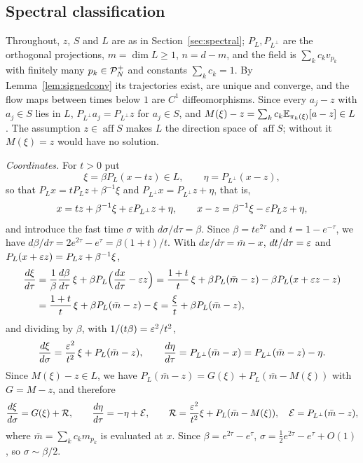 \documentclass{article} %
\makeatletter
\newif\ificlr
\newcommand{\placeblock}[1]{\ificlr\@nameuse{moved@#1}\fi}
\theoremstyle{plain}
\theoremstyle{definition}
\theoremstyle{remark}
\makeatother
\begin{document}
\subsection{Spectral classification}
\label{apx:pf-spectral}

\ificlr\placeblock{spectraldefs}

Throughout, $z$, $S$ and $L$ are as above\else Throughout, $z$, $S$ and $L$ are as in Section~\ref{sec:spectral}\fi; $P_L,P_{L^\perp}$ are the
orthogonal projections, $m=\dim L\ge1$, $n=d-m$, and the field is
$\sum_kc_kv_{p_k}$ with finitely many $p_k\in\mathcal{P}_N^{+}$ and constants $\sum_kc_k=1$. By
Lemma~\ref{lem:signedconv} its trajectories exist, are unique and converge, and the flow maps
between times below $1$ are $C^1$ diffeomorphisms. Since every $a_j-z$ with $a_j\in S$ lies in
$L$, $P_{L^\perp}a_j=P_{L^\perp}z$ for $a_j\in S$, and $M(\xi)-z=\sum_kc_k\mathbb{E}_{\pi_k(\xi)}[a-z]\in L$.
The assumption $z\in\operatorname{aff}S$ makes $L$ the direction space of $\operatorname{aff}S$;
without it $M(\xi)=z$ would have no solution.

\emph{Coordinates.} For $t>0$ put
\[
\xi=\beta P_L(x-tz)\in L,\qquad \eta=P_{L^\perp}(x-z),
\]
so that $P_Lx=tP_Lz+\beta^{-1}\xi$ and $P_{L^\perp}x=P_{L^\perp}z+\eta$, that is,
\[
x=tz+\beta^{-1}\xi+\varepsilon P_{L^\perp}z+\eta,\qquad x-z=\beta^{-1}\xi-\varepsilon P_Lz+\eta,
\]
and introduce the fast time $\sigma$ with $d\sigma/d\tau=\beta$. Since $\beta=te^{2\tau}$ and
$t=1-e^{-\tau}$, we have $d\beta/d\tau=2e^{2\tau}-e^\tau=\beta(1+t)/t$. With $dx/d\tau=\bar m-x$,
$dt/d\tau=\varepsilon$ and $P_L(x+\varepsilon z)=P_Lz+\beta^{-1}\xi$,
\begin{align*}
\frac{d\xi}{d\tau}
&=\frac{1}{\beta}\frac{d\beta}{d\tau}\,\xi+\beta P_L\Bigl(\frac{dx}{d\tau}-\varepsilon z\Bigr)
=\frac{1+t}{t}\,\xi+\beta P_L(\bar m-z)-\beta P_L(x+\varepsilon z-z)\\
&=\frac{1+t}{t}\,\xi+\beta P_L(\bar m-z)-\xi
=\frac{\xi}{t}+\beta P_L(\bar m-z),
\end{align*}
and dividing by $\beta$, with $1/(t\beta)=\varepsilon^2/t^2$,
\[
\frac{d\xi}{d\sigma}=\frac{\varepsilon^2}{t^2}\,\xi+P_L(\bar m-z),\qquad
\frac{d\eta}{d\tau}=P_{L^\perp}(\bar m-x)=P_{L^\perp}(\bar m-z)-\eta .
\]
Since $M(\xi)-z\in L$, we have $P_L(\bar m-z)=G(\xi)+P_L(\bar m-M(\xi))$ with $G=M-z$, and therefore
\begin{equation}
\frac{d\xi}{d\sigma}=G(\xi)+\mathcal R,\qquad
\frac{d\eta}{d\tau}=-\eta+\mathcal E,\qquad
\mathcal R=\frac{\varepsilon^2}{t^2}\xi+P_L(\bar m-M(\xi)),\quad \mathcal E=P_{L^\perp}(\bar m-z),
\label{eq:pf:spec:blowup}
\end{equation}
where $\bar m=\sum_kc_km_{p_k}$ is evaluated at $x$. Since $\beta=e^{2\tau}-e^\tau$,
$\sigma=\tfrac12e^{2\tau}-e^\tau+O(1)$, so $\sigma\sim\beta/2$.
\end{document}
